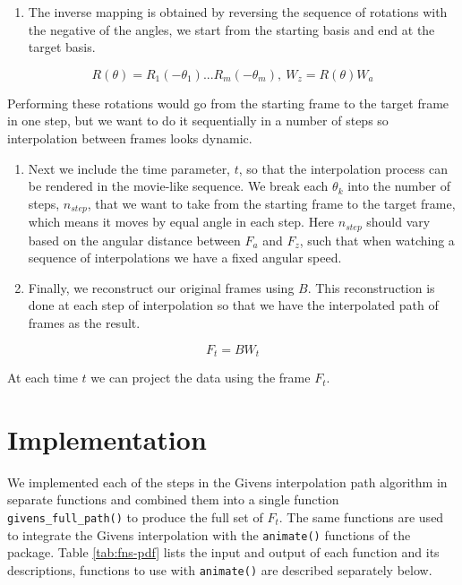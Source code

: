 \begin{enumerate}
\def\labelenumi{\arabic{enumi}.}
\setcounter{enumi}{3}
\tightlist
\item
  The inverse mapping is obtained by reversing the sequence of rotations with the negative of the angles, we start from the starting basis and end at the target basis.
\end{enumerate}

\[R(\theta) = R_1(-\theta_1) ... R_m(-\theta_m), \    W_z = R(\theta)W_a\]

Performing these rotations would go from the starting frame to the target frame in one step, but we want to do it sequentially in a number of steps so interpolation between frames looks dynamic.

\begin{enumerate}
\def\labelenumi{\arabic{enumi}.}
\setcounter{enumi}{4}
\item
  Next we include the time parameter, \(t\), so that the interpolation process can be rendered in the movie-like sequence. We break each \(\theta_k\) into the number of steps, \(n_{step}\), that we want to take from the starting frame to the target frame, which means it moves by equal angle in each step. Here \(n_{step}\) should vary based on the angular distance between \(F_a\) and \(F_z\), such that when watching a sequence of interpolations we have a fixed angular speed.
\item
  Finally, we reconstruct our original frames using \(B\). This reconstruction is done at each step of interpolation so that we have the interpolated path of frames as the result.
\end{enumerate}

\[F_t = B  W_t\]

At each time \(t\) we can project the data using the frame \(F_t\).

\section{Implementation}\label{implementation}

We implemented each of the steps in the Givens interpolation path algorithm in separate functions and combined them into a single function \texttt{givens\_full\_path()} to produce the full set of \(F_t\). The same functions are used to integrate the Givens interpolation with the \texttt{animate()} functions of the  package. Table \ref{tab:fns-pdf} lists the input and output of each function and its descriptions, functions to use with \texttt{animate()} are described separately below.

